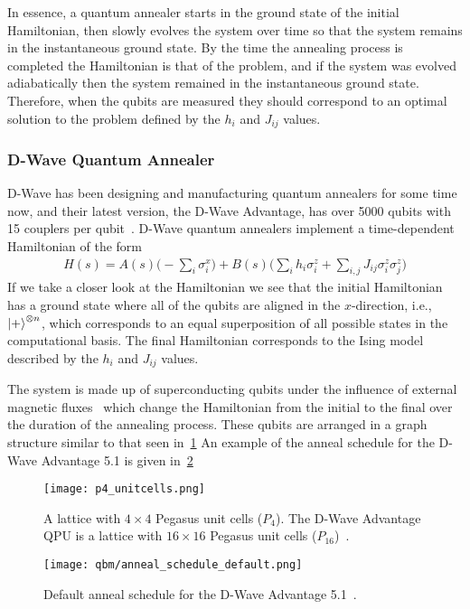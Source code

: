 In essence, a quantum annealer starts in the ground state of the initial Hamiltonian, then slowly evolves the system over time so that the system remains in the instantaneous ground state.
By the time the annealing process is completed the Hamiltonian is that of the problem, and if the system was evolved adiabatically then the system remained in the instantaneous ground state.
Therefore, when the qubits are measured they should correspond to an optimal solution to the problem defined by the \( h_i \) and \( J_{ij} \) values.

\subsubsection{D-Wave Quantum Annealer}
D-Wave has been designing and manufacturing quantum annealers for some time now, and their latest version, the D-Wave Advantage, has over 5000 qubits with 15 couplers per qubit~\cite{dwave_advantage}.
D-Wave quantum annealers implement a time-dependent Hamiltonian of the form~\cite{dwave_qa}
\begin{align}
    H(s) = A(s) \bigg( -\sum_i \sigma_i^x \bigg) + B(s) \bigg( \sum_i h_i \sigma_i^z + \sum_{i,j} J_{ij} \sigma_i^z \sigma_j^z \bigg)
\end{align}
If we take a closer look at the Hamiltonian we see that the initial Hamiltonian has a ground state where all of the qubits are aligned in the \( x \)-direction, i.e., \( \ket{+}^{\otimes n} \), which corresponds to an equal superposition of all possible states in the computational basis.
The final Hamiltonian corresponds to the Ising model described by the \( h_i \) and \( J_{ij} \) values.

The system is made up of superconducting qubits under the influence of external magnetic fluxes~\cite{qc_lecture_notes} which change the Hamiltonian from the initial to the final over the duration of the annealing process.
These qubits are arranged in a graph structure similar to that seen in~\cref{fig:p4_unitcells}
An example of the anneal schedule for the D-Wave Advantage 5.1 is given in~\cref{fig:anneal_schedule_default}
\begin{figure}[!htb]
    \begin{center}
        \texttt{[image: p4\_unitcells.png]}
    \end{center}
    \caption{A lattice with \( 4 \times 4 \) Pegasus unit cells (\( P_4 \)). The D-Wave Advantage QPU is a lattice with \( 16 \times 16 \) Pegasus unit cells (\( P_{16} \))~\cite{dwave_topologies}.}
    \label{fig:p4_unitcells}
\end{figure}
\begin{figure}[!htb]
    \begin{center}
        \texttt{[image: qbm/anneal\_schedule\_default.png]}
    \end{center}
    \caption{Default anneal schedule for the D-Wave Advantage 5.1~\cite{dwave_anneal_schedules}.}
    \label{fig:anneal_schedule_default}
\end{figure}

